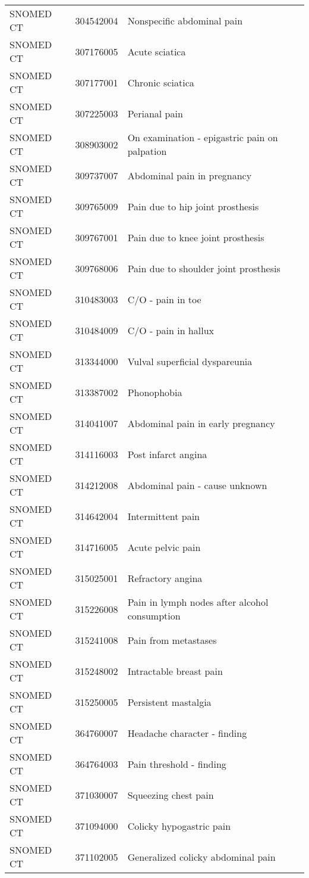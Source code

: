 \begin{longtable}{p{}p{}p{}}
  SNOMED CT & 304542004 & Nonspecific abdominal pain \\ 
  SNOMED CT & 307176005 & Acute sciatica \\ 
  SNOMED CT & 307177001 & Chronic sciatica \\ 
  SNOMED CT & 307225003 & Perianal pain \\ 
  SNOMED CT & 308903002 & On examination - epigastric pain on palpation \\ 
  SNOMED CT & 309737007 & Abdominal pain in pregnancy \\ 
  SNOMED CT & 309765009 & Pain due to hip joint prosthesis \\ 
  SNOMED CT & 309767001 & Pain due to knee joint prosthesis \\ 
  SNOMED CT & 309768006 & Pain due to shoulder joint prosthesis \\ 
  SNOMED CT & 310483003 & C/O - pain in toe \\ 
  SNOMED CT & 310484009 & C/O - pain in hallux \\ 
  SNOMED CT & 313344000 & Vulval superficial dyspareunia \\ 
  SNOMED CT & 313387002 & Phonophobia \\ 
  SNOMED CT & 314041007 & Abdominal pain in early pregnancy \\ 
  SNOMED CT & 314116003 & Post infarct angina \\ 
  SNOMED CT & 314212008 & Abdominal pain - cause unknown \\ 
  SNOMED CT & 314642004 & Intermittent pain \\ 
  SNOMED CT & 314716005 & Acute pelvic pain \\ 
  SNOMED CT & 315025001 & Refractory angina \\ 
  SNOMED CT & 315226008 & Pain in lymph nodes after alcohol consumption \\ 
  SNOMED CT & 315241008 & Pain from metastases \\ 
  SNOMED CT & 315248002 & Intractable breast pain \\ 
  SNOMED CT & 315250005 & Persistent mastalgia \\ 
  SNOMED CT & 364760007 & Headache character - finding \\ 
  SNOMED CT & 364764003 & Pain threshold - finding \\ 
  SNOMED CT & 371030007 & Squeezing chest pain \\ 
  SNOMED CT & 371094000 & Colicky hypogastric pain \\ 
  SNOMED CT & 371102005 & Generalized colicky abdominal pain \\ 

\end{longtable}
